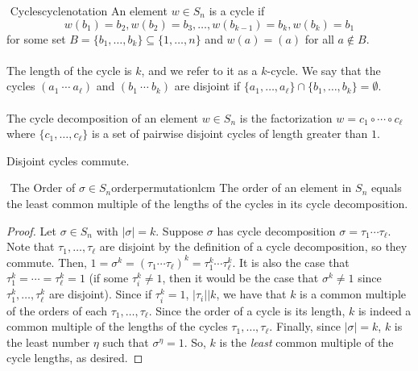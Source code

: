     \begin{definition}{\Stop\,\,Cycles}{cyclenotation}
        An element \(w\in S_n\) is a cycle if 
        \begin{equation*}
            w(b_1)=b_2, w(b_2)=b_3,\ldots, w(b_{k-1})=b_k, w(b_k)=b_1
        \end{equation*}
        for some set \(B=\{b_1,\ldots,b_k\}\subseteq\{1,\ldots,n\}\) and \(w(a)=(a)\) for all \(a\nin B\).
        \\
        \\
        The length of the cycle is \(k\), and we refer to it as a \(k\)-cycle. We say that the cycles \((a_1\ \cdots\ a_\ell)\) and \((b_1\ \cdots\ b_k)\) are disjoint if \(\{a_1,\ldots,a_\ell\}\cap\{b_1,\ldots,b_k\}=\emptyset\).
        \\
        \\
        The cycle decomposition of an element \(w\in S_n\) is the factorization \(w=c_1\circ \cdots \circ c_\ell\) where \(\{c_1,\ldots,c_\ell\}\) is a set of pairwise disjoint cycles of length greater than \(1\).
    \end{definition}
    \begin{remark*}
        Disjoint cycles commute.
    \end{remark*}
    \pagebreak
    \begin{theorem}{\Stop\,\,The Order of \(\sigma\in S_n\)}{orderpermutationlcm}
        The order of an element in \(S_n\) equals the least common multiple of the lengths of the cycles in its cycle decomposition.
        \begin{proof}
            Let \(\sigma\in S_n\) with \(|\sigma|=k\). Suppose \(\sigma\) has cycle decomposition \(\sigma=\tau_1\cdots\tau_\ell\). Note that \(\tau_1,\ldots,\tau_\ell\) are disjoint by the definition of a cycle decomposition, so they commute. Then, \(1=\sigma^k=(\tau_1\cdots\tau_\ell)^k=\tau_1^k\cdots\tau_\ell^k\). It is also the case that \(\tau_1^k=\cdots=\tau_\ell^k=1\) (if some \(\tau_i^k\neq1\), then it would be the case that \(\sigma^k\neq 1\) since \(\tau_1^k,\ldots,\tau_\ell^k\) are disjoint). Since if \(\tau_i^k=1\), \(|\tau_i||k\), we have that \(k\) is a common multiple of the orders of each \(\tau_1,\ldots,\tau_\ell\). Since the order of a cycle is its length, \(k\) is indeed a common multiple of the lengths of the cycles \(\tau_1,\ldots,\tau_\ell\). Finally, since \(|\sigma|=k\), \(k\) is the least number \(\eta\) such that \(\sigma^\eta=1\). So, \(k\) is the \emph{least} common multiple of the cycle lengths, as desired.
        \end{proof}
    \end{theorem}

